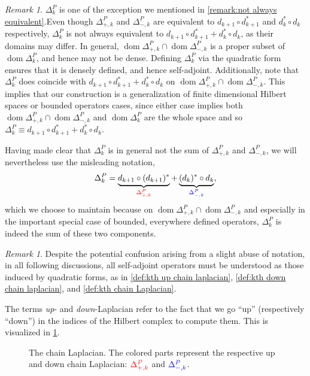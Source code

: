 \documentclass[11pt]{article}
\theoremstyle{definition}
\theoremstyle{remark}
\newtheorem{remark}[theorem]{Remark}
\DeclareMathOperator\dom{dom}
\newcommand{\red}[1]{\textcolor{red}{#1}}
\begin{document}
\begin{remark}\label{remark:not the sum}
    $\Delta ^P_k$ is one of the exception we mentioned in \cref{remark:not always equivalent}.Even though $\Delta^P_{+,k}$ and $\Delta^P_{-,k}$ are equivalent to $d_{k+1}\circ d^*_{k+1}$ and $d^*_{k}\circ d_{k}$ respectively, $\Delta^P_{k}$ is not always equivalent to $d_{k+1}\circ d^*_{k+1}+d_k^*\circ d_k$, as their domains may differ. In general, $\dom \Delta_{+,k}^P\cap\dom\Delta_{-,k}^P$ is a proper subset of $\dom\Delta_k^P$, and hence may not be dense. Defining $\Delta_k^P$ via the quadratic form ensures that it is densely defined, and hence self-adjoint. Additionally, note that $\Delta^P_{k}$ does coincide with $d_{k+1}\circ d^*_{k+1}+d_k^*\circ d_k$ on $\dom \Delta_{+,k}^P\cap\dom\Delta_{-,k}^P$. This implies that our construction is a generalization of finite dimensional Hilbert spaces or bounded operators cases, since either case implies both $\dom \Delta_{+,k}^P\cap\dom\Delta_{-,k}^P$ and $\dom\Delta_k^P$ are the whole space and so $\Delta^P_{k}\equiv d_{k+1}\circ d^*_{k+1}+d_k^*\circ d_k$.
\end{remark}

Having made clear that $\Delta_k^P$ is in general not the sum of $\Delta_{+,k}^P$ and $\Delta_{-,k}^P$, we will nevertheless use the misleading notation, 
    \[
    \Delta^{P}_k=\underbrace{d_{k+1} \circ (d_{k+1})^{*}}_{\textcolor{red}{\Delta^{P}_{+, k}}} + \underbrace{(d_k)^{*} \circ d_k}_{\textcolor{blue}{\Delta^{P}_{-, k}}},
    \]
which we choose to maintain because on $\dom \Delta_{+,k}^P\cap\dom\Delta_{-,k}^P$ and especially in the important special case of bounded, everywhere defined operators, $\Delta_k^P$ is indeed the sum of these two components.
\begin{remark}\label{rek:all quadratic form induced}
    Despite the potential confusion arising from a slight abuse of notation, in all following discussions, all self-adjoint operators must be understood as those induced by quadratic forms, as in \cref{def:kth up chain laplacian}, \ref{def:kth down chain laplacian}, and \ref{def:kth chain Laplacian}.
\end{remark}

The terms \emph{up}- and \emph{down}-Laplacian refer to the fact that we go ``up'' (respectively ``down'') in the indices of the Hilbert complex to compute them. This is visualized in \cref{fig:lap}.

\begin{figure}[H]
\begin{center} 
\caption{The chain Laplacian. The colored parts represent the respective up and down chain Laplacian: $\red{\Delta^{P}_{+, k}}$ and $\textcolor{blue}{\Delta^{P}_{-, k}}$.} \label{fig:lap}
\end{center}
\end{figure}
\end{document}

